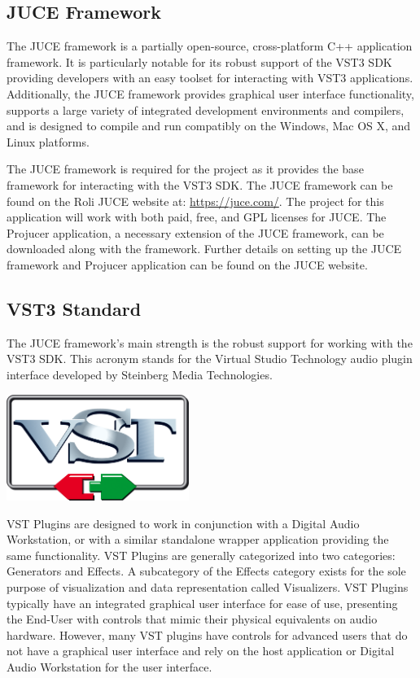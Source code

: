 \documentclass[a4paper,12pt]{report}
\begin{document}
\subsection{JUCE Framework}
\label{subsec:juceframework}
The JUCE framework is a partially open-source, cross-platform C++ application framework. It is particularly notable for its robust support of the VST3 SDK providing developers with an easy toolset for interacting with VST3 applications. Additionally, the JUCE framework provides graphical user interface functionality, supports a large variety of integrated development environments and compilers, and is designed to compile and run compatibly on the Windows, Mac OS X, and Linux platforms.

The JUCE framework is required for the project as it provides the base framework for interacting with the VST3 SDK. The JUCE framework can be found on the Roli JUCE website at: \href{https://juce.com/}{https://juce.com/}. The project for this application will work with both paid, free, and GPL licenses for JUCE. The Projucer application, a necessary extension of the JUCE framework, can be downloaded along with the framework. Further details on setting up the JUCE framework and Projucer application can be found on the JUCE website.

\subsection{VST3 Standard}
\label{subsec:vst3standard}
The JUCE framework's main strength is the robust support for working with the VST3 SDK. This acronym stands for the Virtual Studio Technology audio plugin interface developed by Steinberg Media Technologies. 

\begin{center}
\includegraphics[width=16em]{VST3Logo.png}
\end{center}

VST Plugins are designed to work in conjunction with a Digital Audio Workstation, or with a similar standalone wrapper application providing the same functionality. VST Plugins are generally categorized into two categories: Generators and Effects. A subcategory of the Effects category exists for the sole purpose of visualization and data representation called Visualizers. VST Plugins typically have an integrated graphical user interface for ease of use, presenting the End-User with controls that mimic their physical equivalents on audio hardware. However, many VST plugins have controls for advanced users that do not have a graphical user interface and rely on the host application or Digital Audio Workstation for the user interface.
\end{document}
